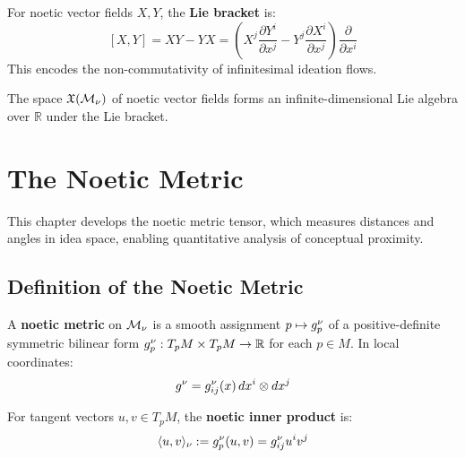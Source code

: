 \begin{definition}
\label{def:lie-bracket}
For noetic vector fields $X, Y$, the \textbf{Lie bracket} is:
\[
    [X, Y] = XY - YX = \left(X^j \frac{\partial Y^i}{\partial x^j}
    - Y^j \frac{\partial X^i}{\partial x^j}\right) \frac{\partial}{\partial x^i}
\]
This encodes the non-commutativity of infinitesimal ideation flows.
\end{definition}

\begin{theorem}
\label{thm:noetic-lie-algebra}
The space $\mathfrak{X}(\mathcal{M}_\nu)$ of noetic vector fields forms an
infinite-dimensional Lie algebra over $\mathbb{R}$ under the Lie bracket.
\end{theorem}


\chapter{The Noetic Metric}
\label{ch:noetic-metric}

\begin{tcolorbox}[colback=blue!5!white,colframe=blue!75!black,title=\vnewfour]
This chapter develops the noetic metric tensor, which measures distances and
angles in idea space, enabling quantitative analysis of conceptual proximity.
\end{tcolorbox}

\section{Definition of the Noetic Metric}

\begin{definition}
\label{def:noetic-metric}
A \textbf{noetic metric} on $\mathcal{M}_\nu$ is a smooth assignment
$p \mapsto g^\nu_p$ of a positive-definite symmetric bilinear form
$g^\nu_p : T_pM \times T_pM \to \mathbb{R}$ for each $p \in M$.
In local coordinates:
\[
    g^\nu = g^\nu_{ij}(x) \, dx^i \otimes dx^j
\]
\end{definition}

\begin{definition}
\label{def:noetic-inner-product}
For tangent vectors $u, v \in T_pM$, the \textbf{noetic inner product} is:
\[
    \langle u, v \rangle_\nu := g^\nu_p(u, v) = g^\nu_{ij} u^i v^j
\]
\end{definition}

